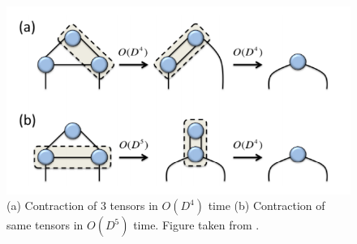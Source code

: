 \begin{figure}[H]
    \center
    \includegraphics[width=0.8 \textwidth]{Figuren/tnalgs/contraction_order.png}
    \caption{ (a) Contraction of 3 tensors in $O(D^4)$ time (b) Contraction of same tensors in $O(D^5)$ time. Figure taken from \cite{Orus2014}.  }
    \label{fig:tnalgs:cont_ord}
\end{figure}